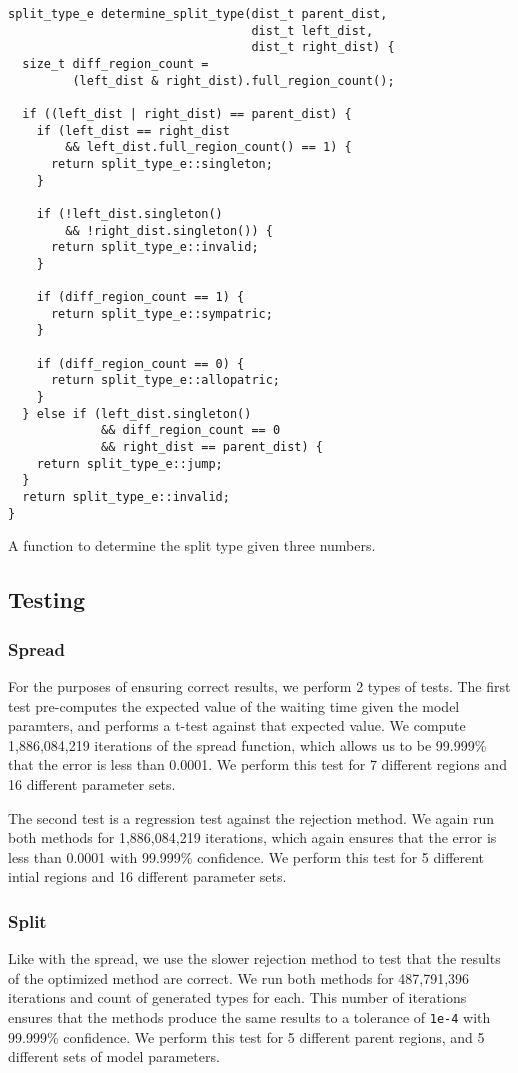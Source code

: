 \documentclass{article}
\begin{document}
\begin{listing}
  \begin{verbatim}
split_type_e determine_split_type(dist_t parent_dist, 
                                  dist_t left_dist, 
                                  dist_t right_dist) {
  size_t diff_region_count =
         (left_dist & right_dist).full_region_count();

  if ((left_dist | right_dist) == parent_dist) {
    if (left_dist == right_dist 
        && left_dist.full_region_count() == 1) {
      return split_type_e::singleton;
    }

    if (!left_dist.singleton() 
        && !right_dist.singleton()) {
      return split_type_e::invalid;
    }

    if (diff_region_count == 1) {
      return split_type_e::sympatric;
    }

    if (diff_region_count == 0) {
      return split_type_e::allopatric;
    }
  } else if (left_dist.singleton()
             && diff_region_count == 0
             && right_dist == parent_dist) {
    return split_type_e::jump;
  }
  return split_type_e::invalid;
}
\end{verbatim}
  \caption{A function to determine the split type given three numbers.}
  \label{lst:determine-split-type}
\end{listing}

\subsection{Testing}


\subsubsection{Spread}

For the purposes of ensuring correct results, we perform 2 types of tests.
The first test pre-computes the expected value of the waiting time given the model paramters, and performs a t-test
against that expected value.
We compute 1,886,084,219 iterations of the spread function, which allows us to be 99.999\% that the error is less than
0.0001.
We perform this test for 7 different regions and 16 different parameter sets.

The second test is a regression test against the rejection method. We again run both methods for 1,886,084,219
iterations, which again ensures that the error is less than 0.0001 with 99.999\% confidence.
We perform this test for 5 different intial regions and 16 different parameter sets.


\subsubsection{Split}

Like with the spread, we use the slower rejection method to test that the results of the optimized method are correct.
We run both methods for 487,791,396 iterations and count of generated types for each.
This number of iterations ensures that the methods produce the same results to a tolerance of \texttt{1e-4} with
99.999\% confidence.
We perform this test for 5 different parent regions, and 5 different sets of model parameters.


\end{document}
